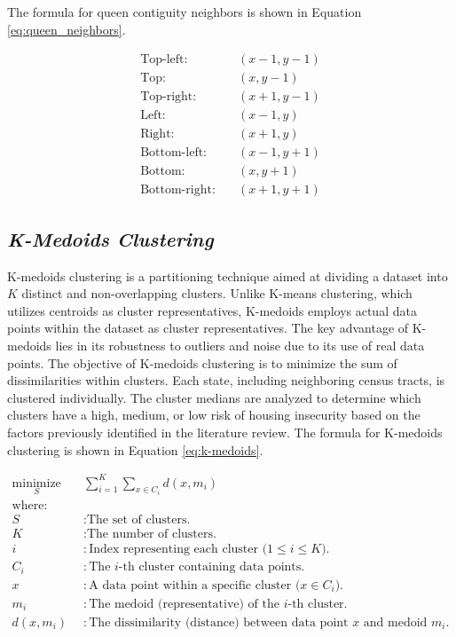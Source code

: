 The formula for queen contiguity neighbors is shown in Equation \ref{eq:queen_neighbors}.

\begin{equation}
    \label{eq:queen_neighbors}
    \begin{aligned}
        \text{Top-left:} & \quad (x-1, y-1) \\
        \text{Top:} & \quad (x, y-1) \\
        \text{Top-right:} & \quad (x+1, y-1) \\
        \text{Left:} & \quad (x-1, y) \\
        \text{Right:} & \quad (x+1, y) \\
        \text{Bottom-left:} & \quad (x-1, y+1) \\
        \text{Bottom:} & \quad (x, y+1) \\
        \text{Bottom-right:} & \quad (x+1, y+1)
    \end{aligned}
\end{equation}

\subsection{\textit{K-Medoids Clustering}}
K-medoids clustering is a partitioning technique aimed at dividing a dataset into \(K\) distinct and non-overlapping clusters. Unlike K-means clustering, which utilizes centroids as cluster representatives, K-medoids employs actual data points within the dataset as cluster representatives. The key advantage of K-medoids lies in its robustness to outliers and noise due to its use of real data points. The objective of K-medoids clustering is to minimize the sum of dissimilarities within clusters. Each state, including neighboring census tracts, is clustered individually. The cluster medians are analyzed to determine which clusters have a high, medium, or low risk of housing insecurity based on the factors previously identified in the literature review. The formula for K-medoids clustering is shown in Equation \ref{eq:k-medoids}.

\begin{equation}\label{eq:k-medoids}
    \begin{aligned}
        \underset{S}{\text{minimize}} \quad & \sum_{i=1}^{K} \sum_{x \in C_i} d(x, m_i) \\
        \text{where:} \\
        S & : \text{The set of clusters.} \\
        K & : \text{The number of clusters.} \\
        i & : \text{Index representing each cluster (\(1 \leq i \leq K\)).} \\
        C_i & : \text{The \(i\)-th cluster containing data points.} \\
        x & : \text{A data point within a specific cluster (\(x \in C_i\)).} \\
        m_i & : \text{The medoid (representative) of the \(i\)-th cluster.} \\
        d(x, m_i) & : \text{The dissimilarity (distance) between data point \(x\) and medoid \(m_i\).}
    \end{aligned}
\end{equation}

